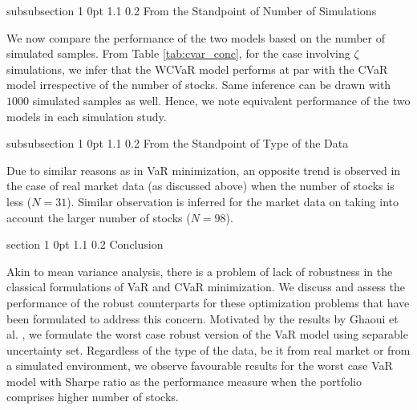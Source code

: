 \documentclass[12pt]{article}
\makeatletter
\numberwithin{equation}{section}
\renewcommand{\section}{
  \@startsection
  {section}%
  {1}%
  {0pt}%
  {1.1\baselineskip}%
  {0.2\baselineskip}%
  {\sc \centering}%
}
\renewcommand{\subsubsection}{
  \@startsection
  {subsubsection}%
  {1}%
  {0pt}%
  {1.1\baselineskip}%
  {0.2\baselineskip}%
  {\sc \centering}%
}
\makeatother
\begin{document}
\subsubsection{From the Standpoint of Number of Simulations}

We now compare the performance of the two models based on the number of simulated samples. From Table \ref{tab:cvar_conc}, for the case involving $\zeta$ simulations, we infer that the WCVaR model performs at par with the CVaR model irrespective of the number of stocks. Same inference can be drawn with $1000$ simulated samples as well. Hence, we note equivalent performance of the two models in each simulation study.

\subsubsection{From the Standpoint of Type of the Data}

Due to similar reasons as in VaR minimization, an opposite trend is observed in the case of real market data (as discussed above) when the number of stocks is less ($N=31$). Similar observation is inferred for the market data on taking into account the larger number of stocks ($N=98$).

\section{Conclusion}
\label{Conclusion}

Akin to mean variance analysis, there is a problem of lack of robustness in the classical formulations of VaR and CVaR minimization. We discuss and assess the performance of the robust counterparts for these optimization problems that have been formulated to address this concern. Motivated by the results by Ghaoui et al. \cite{ghaoui03}, we formulate the worst case robust version of the VaR model using separable uncertainty set. Regardless of the type of the data, be it from real market or from a simulated environment, we observe favourable results for the worst case VaR model with Sharpe ratio as the performance measure when the portfolio comprises higher number of stocks.
\end{document}
